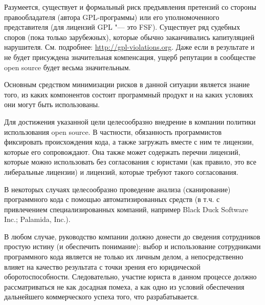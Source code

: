 \documentclass[10pt, a5paper]{article}
\begin{document}
Разумеется, существует и формальный риск предъявления претензий со стороны правообладателя (автора GPL-программы) или его уполномоченного представителя (для лицензий GPL "--- это FSF). Существует ряд судебных споров (пока только зарубежных), которые обычно заканчивались капитуляцией нарушителя. См. подробнее: \url{http://gpl-violations.org}. Даже если в результате и не будет присуждена значительная компенсация, ущерб репутации в сообществе open source будет весьма значительным.

Основным средством минимизации рисков в данной ситуации является знание того, из каких компонентов состоит программный продукт и на каких условиях они могут быть использованы.

Для достижения указанной цели целесообразно внедрение в компании политики использования open source. В частности, обязанность программистов фиксировать происхождения кода, а также загружать вместе с ним те лицензии, которые его сопровождают. Она также может содержать перечни лицензий, которые можно использовать без согласования с юристами (как правило, это все либеральные лицензии) и лицензий, которые требуют такого согласования.

В некоторых случаях целесообразно проведение анализа (сканирование) программного кода с помощью автоматизированных \linebreak средств (в т.ч. с привлечением специализированных компаний, например Black Duck Software Inc.; Palamida, Inc.).

В любом случае, руководство компании должно донести до сведения сотрудников простую истину (и обеспечить понимание): выбор и использование сотрудниками программного кода является не только их личным делом, а непосредственно влияет на качество результата с точки зрения его юридической оборотоспособности. Следовательно, участие юриста в данном процессе должно рассматриваться не как досадная помеха, а как одно из условий обеспечения дальнейшего коммерческого успеха того, что разрабатывается.
\end{document}
